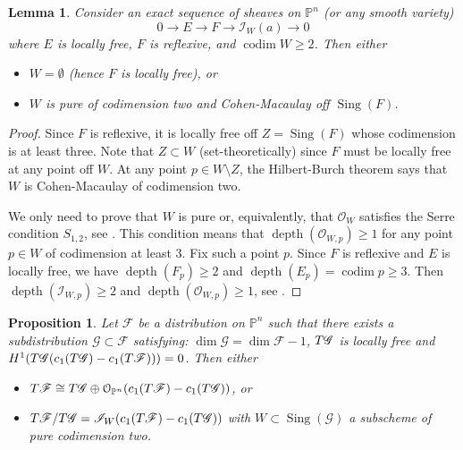 \documentclass[twoside]{amsart}
\numberwithin{equation}{section}
\newcommand{\opn}{{\mathcal O}_{\mathbb{P}^{n}}}
\newcommand{\pn}{{\mathbb{P}^{n}}}
\newcommand{\sI}{\mathscr{I}}
\DeclareMathOperator{\sing}{Sing}
\DeclareMathOperator{\codim}{codim}
\DeclareMathOperator{\depth}{depth}
\def\OO{\mathcal{O}}
\newcommand{\sF}{\mathscr{F}}
\newcommand{\sG}{\mathscr{G}}
\newcommand{\tF}{{\rm T}\sF}
\newcommand{\tG}{{\rm T}\sG}
\newcommand{\lra}{ \longrightarrow }
\newtheorem{proposition}[theorem]{Proposition}
\newtheorem{lemma}[theorem]{Lemma}
\theoremstyle{definition}
\begin{document}
\begin{lemma}\label{lem:codim-ext}
Consider an exact sequence of sheaves on $\pn$ (or any smooth variety)
\[
0 \lra E \lra F \lra \sI_W(a) \lra 0
\]
where $E$ is locally free, $F$ is reflexive, and $\codim W \geq 2$. Then either 
\begin{itemize}
    \item $W= \emptyset$ (hence $F$ is locally free), or
    \item $W$ is pure of codimension two and Cohen-Macaulay off $\sing(F)$. 
\end{itemize}


\end{lemma}

\begin{proof}
Since $F$ is reflexive, it is locally free off $Z = \sing(F)$ whose codimension is at least three. Note that $Z\subset W$ (set-theoretically) since $F$ must be locally free at any point off $W$. At any point $p\in W\setminus Z$, the Hilbert-Burch theorem says that $W$ is Cohen-Macaulay of codimension two. 

We only need to prove that $W$ is pure or, equivalently, that $\OO_W$ satisfies the Serre condition $S_{1,2}$, see \cite[Proposition 1.1.10]{HL-sheaves}. This condition means that $\depth(\OO_{W,p}) \geq 1$ for any point $p\in W$ of codimension at least $3$. Fix such a point $p$. Since $F$ is reflexive and $E$ is locally free, we have $\depth(F_p) \geq 2$ and $\depth(E_p) =\codim p \geq 3$. Then $\depth(\sI_{W,p}) \geq 2$ and $\depth(\OO_{W,p}) \geq 1$, see \cite[Proposition 1.2.9]{BH-CMrings}.
\end{proof}



\begin{proposition}\label{prop:sing2xsplit}
Let $\sF$ be a distribution on $\pn$ such that there exists a subdistribution $\sG \subset \sF$ satisfying: $\dim \sG = \dim \sF - 1$, $\tG$ is locally free and $H^1(\tG(c_1(\tG) - c_1(\tF))) = 0$. Then either 
\begin{itemize}
    \item $\tF \cong \tG \oplus \opn(c_1(\tF) - c_1(\tG))$, or
    \item $\tF/\tG = \sI_W(c_1(\tF) - c_1(\tG))$ with $W \subset \sing(\sG)$ a subscheme of pure codimension two.
\end{itemize} 

\end{proposition}
\end{document}
